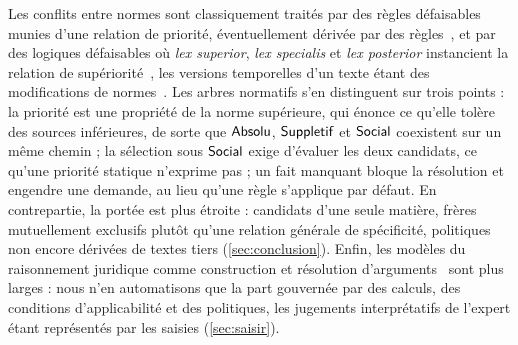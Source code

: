 Les conflits entre normes sont classiquement traités par des règles
défaisables munies d'une relation de priorité, éventuellement dérivée par
des règles~\cite{prakkensartor1996,prakkensartor1997}, et par des logiques
défaisables où \emph{lex superior}, \emph{lex specialis} et \emph{lex
posterior} instancient la relation de supériorité~\cite{governatori2021},
les versions temporelles d'un texte étant des modifications de
normes~\cite{governatori2005}. Les arbres normatifs s'en distinguent sur
trois points : la priorité est une propriété de la norme supérieure, qui
énonce ce qu'elle tolère des sources inférieures, de sorte que
\(\mathsf{Absolu}\), \(\mathsf{Suppletif}\) et \(\mathsf{Social}\) coexistent sur un même
chemin ; la sélection sous \(\mathsf{Social}\) exige d'évaluer les deux candidats,
ce qu'une priorité statique n'exprime pas ; un fait manquant bloque la
résolution et engendre une demande, au lieu qu'une règle s'applique par
défaut. En contrepartie, la portée est plus étroite : candidats d'une seule
matière, frères mutuellement exclusifs plutôt qu'une relation générale de
spécificité, politiques non encore dérivées de textes tiers
(\autoref{sec:conclusion}). Enfin, les modèles du raisonnement juridique
comme construction et résolution
d'arguments~\cite{gordon1993pleadings,benchcapon2009argumentation} sont plus
larges : nous n'en automatisons que la part gouvernée par des calculs, des
conditions d'applicabilité et des politiques, les jugements interprétatifs
de l'expert étant représentés par les saisies (\autoref{sec:saisir}).
